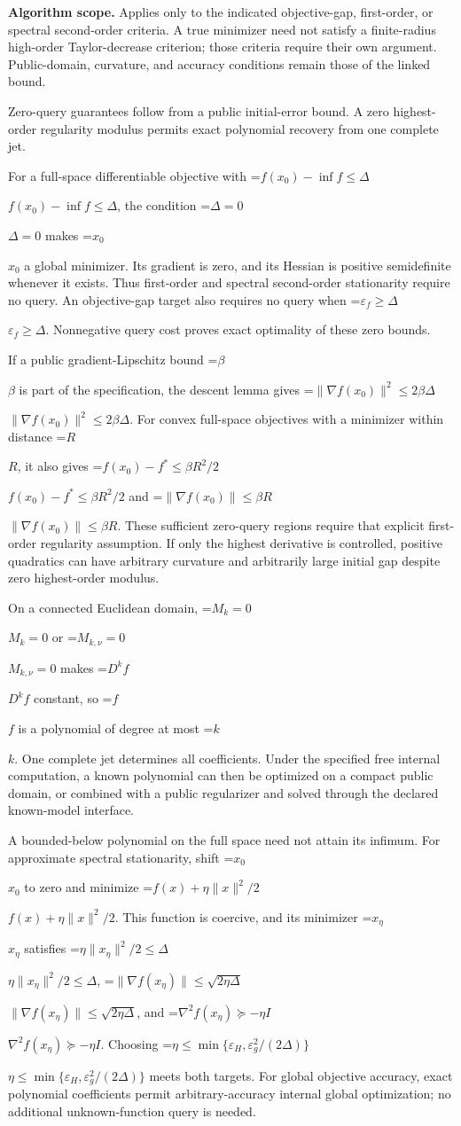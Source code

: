 \documentclass[10pt,a4paper]{article}
\newcommand{\AtlasMath}[1]{\par\begingroup\centering\setbox0=\hbox{$\displaystyle #1$}\ifdim\wd0>1.4\linewidth\typeout{ATLAS WIDE FORMULA: \the\wd0}\fi\ifdim\wd0>\linewidth\resizebox{\linewidth}{!}{\box0}\else\box0\fi\par\endgroup}
\newcommand{\AtlasInlineMath}[1]{\begingroup\setbox0=\hbox{$#1$}\ifdim\wd0>.4\linewidth\endgroup\AtlasMath{#1}\else\endgroup$#1$\fi}
\begin{document}
\textbf{Algorithm scope.} Applies only to the indicated objective-gap, first-order, or spectral second-order criteria. A true minimizer need not satisfy a finite-radius high-order Taylor-decrease criterion; those criteria require their own argument. Public-domain, curvature, and accuracy conditions remain those of the linked bound.

Zero-query guarantees follow from a public initial-error bound. A zero highest-order regularity modulus permits exact polynomial recovery from one complete jet.

For a full-space differentiable objective with \AtlasInlineMath{f(x_0)-\inf f\le\Delta}, the condition \AtlasInlineMath{\Delta=0} makes \AtlasInlineMath{x_0} a global minimizer. Its gradient is zero, and its Hessian is positive semidefinite whenever it exists. Thus first-order and spectral second-order stationarity require no query. An objective-gap target also requires no query when \AtlasInlineMath{\varepsilon_f\ge\Delta}. Nonnegative query cost proves exact optimality of these zero bounds.

If a public gradient-Lipschitz bound \AtlasInlineMath{\beta} is part of the specification, the descent lemma gives \AtlasInlineMath{\|\nabla f(x_0)\|^2\le2\beta\Delta}. For convex full-space objectives with a minimizer within distance \AtlasInlineMath{R}, it also gives \AtlasInlineMath{f(x_0)-f^*\le\beta R^2/2} and \AtlasInlineMath{\|\nabla f(x_0)\|\le\beta R}. These sufficient zero-query regions require that explicit first-order regularity assumption. If only the highest derivative is controlled, positive quadratics can have arbitrary curvature and arbitrarily large initial gap despite zero highest-order modulus.

On a connected Euclidean domain, \AtlasInlineMath{M_k=0} or \AtlasInlineMath{M_{k,\nu}=0} makes \AtlasInlineMath{D^kf} constant, so \AtlasInlineMath{f} is a polynomial of degree at most \AtlasInlineMath{k}. One complete jet determines all coefficients. Under the specified free internal computation, a known polynomial can then be optimized on a compact public domain, or combined with a public regularizer and solved through the declared known-model interface.

A bounded-below polynomial on the full space need not attain its infimum. For approximate spectral stationarity, shift \AtlasInlineMath{x_0} to zero and minimize \AtlasInlineMath{f(x)+\eta\|x\|^2/2}. This function is coercive, and its minimizer \AtlasInlineMath{x_\eta} satisfies \AtlasInlineMath{\eta\|x_\eta\|^2/2\le\Delta}, \AtlasInlineMath{\|\nabla f(x_\eta)\|\le\sqrt{2\eta\Delta}}, and \AtlasInlineMath{\nabla^2f(x_\eta)\succeq-\eta I}. Choosing \AtlasInlineMath{\eta\le\min\{\varepsilon_H,\varepsilon_g^2/(2\Delta)\}} meets both targets. For global objective accuracy, exact polynomial coefficients permit arbitrary-accuracy internal global optimization; no additional unknown-function query is needed.
\end{document}
